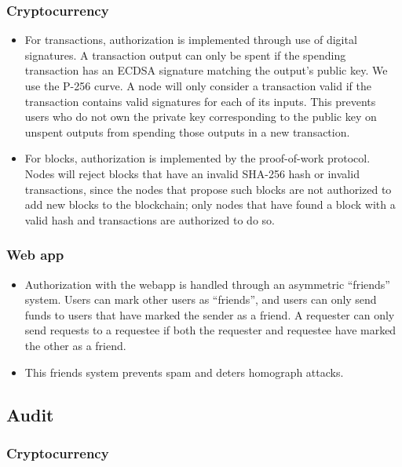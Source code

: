 \documentclass[12pt]{article}
\begin{document}
\subsubsection*{Cryptocurrency}

\begin{itemize}
	\item For transactions, authorization is implemented through use of digital signatures.
	A transaction output can only be spent if the spending transaction has an ECDSA signature matching the output's public key.
	We use the P-256 curve.
	A node will only consider a transaction valid if the transaction contains valid signatures for each of its inputs.
	This prevents users who do not own the private key corresponding to the public key on unspent outputs from spending those outputs in a new transaction.
	\item For blocks, authorization is implemented by the proof-of-work protocol.
	Nodes will reject blocks that have an invalid SHA-256 hash or invalid transactions, since the nodes that propose such blocks are not authorized to add new blocks to the blockchain; only nodes that have found a block with a valid hash and transactions are authorized to do so.
\end{itemize}

\subsubsection*{Web app}

\begin{itemize}
	\item Authorization with the webapp is handled through an asymmetric ``friends'' system.
	Users can mark other users as ``friends'', and users can only send funds to users that have marked the sender as a friend.
  A requester can only send requests to a requestee if both the requester and requestee have marked the other as a friend.
	\item This friends system prevents spam and deters homograph attacks.
\end{itemize}

\subsection{Audit}

\subsubsection*{Cryptocurrency}
\end{document}

